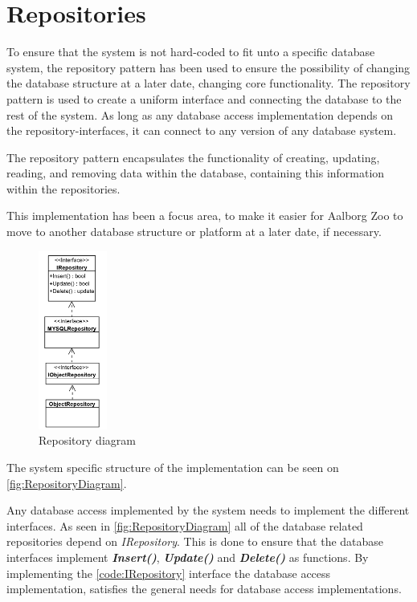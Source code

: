 \section{Repositories} \label{sc:RepositoryPatern}
To ensure that the system is not hard-coded to fit unto a specific database system, the repository pattern \citep{RepositoryPattern} has been used to ensure the possibility of changing the database structure at a later date, changing core functionality. The repository pattern is used to create a uniform interface and connecting the database to the rest of the system. As long as any database access implementation depends on the repository-interfaces, it can connect to any version of any database system.
\par
The repository pattern encapsulates the functionality of creating, updating, reading, and removing data within the database, containing this information within the repositories.
\par
This implementation has been a focus area, to make it easier for Aalborg Zoo to move to another database structure or platform at a later date, if necessary. 

\begin{figure}[H]
    \centering
    \includegraphics[width=0.2\textwidth]{figures/Implementation/GenericRepositoryStructure.PNG}
    \caption{Repository diagram}
    \label{fig:RepositoryDiagram}
\end{figure}

The system specific structure of the implementation can be seen on \autoref{fig:RepositoryDiagram}.
\par
Any database access implemented by the system needs to implement the different interfaces. As seen in \autoref{fig:RepositoryDiagram} all of the database related repositories depend on \textit{IRepository}. This is done to ensure that the database interfaces implement \textbf{\textit{Insert()}}, \textbf{\textit{Update()}} and \textbf{\textit{Delete()}} as functions. By implementing the \autoref{code:IRepository} interface the database access implementation, satisfies the general needs for database access implementations.

